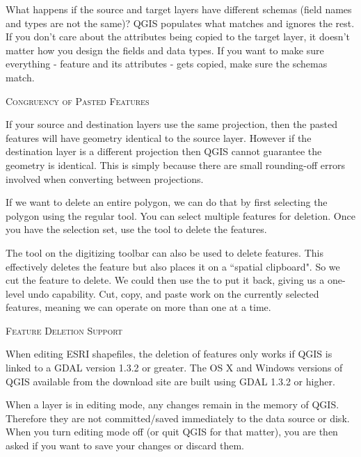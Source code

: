 What happens if the source and target layers have
different schemas (field names and types are not the same)? QGIS populates
what matches and ignores the rest. If you don't care about the attributes
being copied to the target layer, it doesn't matter how you design the
fields and data types. If you want to make sure everything - feature and its
attributes - gets copied, make sure the schemas match.

\begin{Tip}[ht]\caption{\textsc{Congruency of Pasted Features}}
If your source and destination layers use the
same projection, then the pasted features will have
geometry identical to the source layer.
However if the destination layer is a different projection
then QGIS cannot guarantee the geometry is identical.
This is simply because there are small rounding-off errors
involved when converting between projections.
\end{Tip}


If we want to delete an entire polygon, we can do that by first selecting 
the polygon using the regular  tool. You can select 
multiple features for deletion. Once you have the selection set, use the 
 tool to delete the features. 

The  tool on the digitizing toolbar can
also be used to delete features. This effectively deletes the feature but
also places it on a ``spatial clipboard". So we cut the feature to delete. 
We could then use the  to put it back, giving us a one-level undo 
capability. Cut, copy, and paste work on the currently selected features, 
meaning we can operate on more than one at a time.

\begin{Tip}[ht]\caption{\textsc{Feature Deletion Support}}
When editing ESRI shapefiles, the deletion
of features only works if QGIS is linked to a GDAL version 1.3.2 or greater. 
The OS X and Windows versions of QGIS available from the download site are built 
using GDAL 1.3.2 or higher.
\end{Tip}


When a layer is in editing mode, any changes remain in the memory of QGIS.
Therefore they are not committed/saved immediately to the data source or disk.
When you turn editing mode off (or quit QGIS for that matter), 
you are then asked if you want to save your
changes or discard them.

